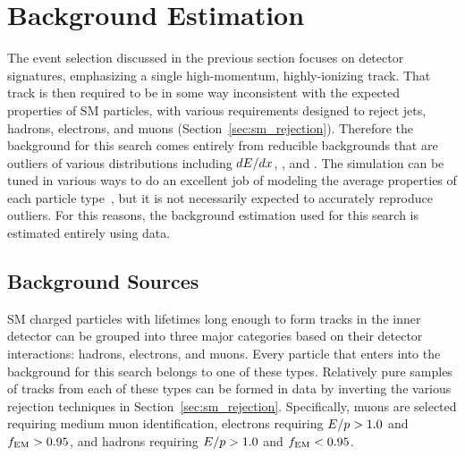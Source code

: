 \chapter{Background Estimation}

\label{ch:background}

The event selection discussed in the previous section focuses on detector signatures, emphasizing a single high-momentum, highly-ionizing track.
That track is then required to be in some way inconsistent with the expected properties of \ac{SM} particles, with various requirements designed to reject jets, hadrons, electrons, and muons (Section~\ref{sec:sm_rejection}).
Therefore the background for this search comes entirely from reducible backgrounds that are outliers of various distributions including $dE/dx$, \emfrac, and \ptcone.
The simulation can be tuned in various ways to do an excellent job of modeling the average properties of each particle type~\cite{atlas_sim}, but it is not necessarily expected to accurately reproduce outliers.
For this reasons, the background estimation used for this search is estimated entirely using data.

\section{Background Sources}
\label{sec:background_sources}
\ac{SM} charged particles with lifetimes long enough to form tracks in the inner detector can be grouped into three major categories based on their detector interactions: hadrons, electrons, and muons. 
Every particle that enters into the background for this search belongs to one of these types.
Relatively pure samples of tracks from each of these types can be formed in data by inverting the various rejection techniques in Section~\ref{sec:sm_rejection}.
Specifically, muons are selected requiring medium muon identification, electrons requiring $E/p > 1.0$ and $f_\mathrm{EM} > 0.95$, and hadrons requiring $E/p > 1.0$ and $f_\mathrm{EM} < 0.95$. 

